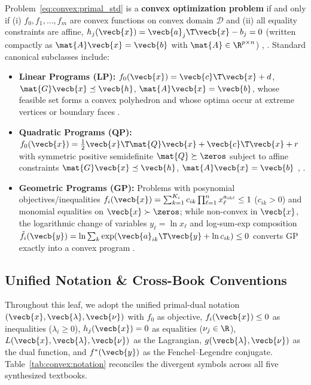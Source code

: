\documentclass[../../../../master.tex]{subfiles}
\begin{document}
Problem~\eqref{eq:convex:primal_std} is a \textbf{convex optimization problem} if and only if (i) $f_0, f_1, \dots, f_m$ are convex functions on convex domain $\mathcal{D}$ and (ii) all equality constraints are affine, $h_j(\vecb{x}) = \vecb{a}_j\T \vecb{x} - b_j = 0$ (written compactly as $\mat{A}\vecb{x} = \vecb{b}$ with $\mat{A} \in \R^{p \times n}$) , . Standard canonical subclasses include:
\begin{itemize}[leftmargin=1.4em]
  \item \textbf{Linear Programs (LP):} $f_0(\vecb{x}) = \vecb{c}\T\vecb{x} + d$, $\mat{G}\vecb{x} \preceq \vecb{h}$, $\mat{A}\vecb{x} = \vecb{b}$, whose feasible set forms a convex polyhedron  and whose optima occur at extreme vertices or boundary faces .
  \item \textbf{Quadratic Programs (QP):} $f_0(\vecb{x}) = \frac{1}{2}\vecb{x}\T\mat{Q}\vecb{x} + \vecb{c}\T\vecb{x} + r$ with symmetric positive semidefinite $\mat{Q} \succeq \zeros$ subject to affine constraints $\mat{G}\vecb{x} \preceq \vecb{h}$, $\mat{A}\vecb{x} = \vecb{b}$ , .
  \item \textbf{Geometric Programs (GP):} Problems with posynomial objectives/inequalities $f_i(\vecb{x}) = \sum_{k=1}^{K_i} c_{ik}\prod_{\ell=1}^n x_\ell^{a_{ik\ell}} \le 1$ ($c_{ik}>0$) and monomial equalities on $\vecb{x} \succ \zeros$; while non-convex in $\vecb{x}$, the logarithmic change of variables $y_\ell = \ln x_\ell$ and log-sum-exp composition $\tilde{f}_i(\vecb{y}) = \ln \sum_{k} \exp(\vecb{a}_{ik}\T\vecb{y} + \ln c_{ik}) \le 0$ converts GP exactly into a convex program .
\end{itemize}

\subsection{Unified Notation \& Cross-Book Conventions}

Throughout this leaf, we adopt the unified primal-dual notation $(\vecb{x}, \vecb{\lambda}, \vecb{\nu})$ with $f_0$ as objective, $f_i(\vecb{x}) \le 0$ as inequalities ($\lambda_i \ge 0$), $h_j(\vecb{x}) = 0$ as equalities ($\nu_j \in \R$), $L(\vecb{x}, \vecb{\lambda}, \vecb{\nu})$ as the Lagrangian, $g(\vecb{\lambda}, \vecb{\nu})$ as the dual function, and $f^*(\vecb{y})$ as the Fenchel--Legendre conjugate. Table~\ref{tab:convex:notation} reconciles the divergent symbols across all five synthesized textbooks.
\end{document}

